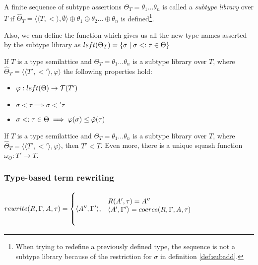 \documentclass[main.tex]{subfiles}
\begin{document}
\begin{defn}
    A finite sequence of subtype assertions
    $\Theta_T = \theta_1 ... \theta_n$ is called a \emph{subtype library} over $T$
    if $\hat{\Theta}_T = \langle \langle T, \less \rangle, \emptyset \rangle \oplus \theta_1 \oplus \theta_2 ... \oplus \theta_n$
    is defined\footnote{
        When trying to redefine a previously defined type, the sequence is not
        a subtype library because of the restriction for $\sigma$
        in definition \ref{def:subadd}.
    }.

    Also, we can define the function which gives us all the new type names
    asserted by the subtype library as
    $left(\Theta_T) = \{ \sigma \mid \sigma <: \tau \in \Theta \}$
\end{defn}

\begin{prop}
    If $T$ is a type semilattice and
    $\Theta_T = \theta_1 ... \theta_n$ is a subtype library over $T$, where
    $\hat{\Theta}_T = \langle \langle T', \less' \rangle, \varphi \rangle$
    the following properties hold:
    \begin{itemize}
        \item $\varphi : left(\Theta) \rightarrow \mathcal{T}( T' )$
        \item $\sigma \less \tau \implies \sigma \less' \tau$
        \item $\sigma <: \tau \in \Theta \implies \varphi(\sigma) \leq \hat{\varphi}(\tau)$
    \end{itemize}
\end{prop}

\begin{prop}
    If $T$ is a type semilattice and
    $\Theta_T = \theta_1 ... \theta_n$ is a subtype library over $T$, where
    $\hat{\Theta}_T = \langle \langle T', \less' \rangle, \varphi \rangle$,
    then $T' \less T$. Even more, there is a unique squash function
    $\omega_{\Theta} : T' \rightarrow T$.
\end{prop}

\subsubsection{Type-based term rewriting}

\[
rewrite(R, \Gamma, A, \tau) =
\begin{cases*}
    \langle A'', \Gamma' \rangle,
    & \parbox{.6\textwidth}{\vspace{1em}
        $R(A', \tau) = A''$ \\
        $\langle A', \Gamma' \rangle = coerce(R, \Gamma, A, \tau)$ \\
        \vspace{1em}} \\
\end{cases*}
\]
\end{document}

